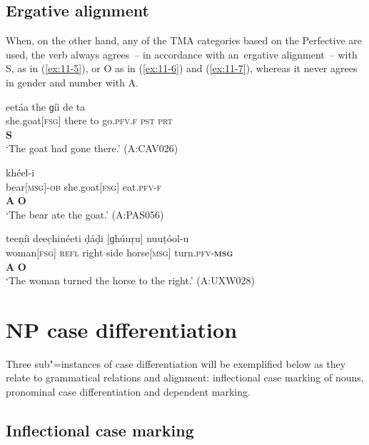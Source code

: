 \subsection{Ergative alignment}
\label{subsec:11-1-2}


When, on the other hand, any of the TMA categories based on the Perfective are used, the verb always agrees~-- in accordance with an~ergative alignment~-- with S, as in (\ref{ex:11-5}), or O as in (\ref{ex:11-6}) and (\ref{ex:11-7}), whereas it never agrees in gender and number with A.

\begin{exe}
\ex
\label{ex:11-5}
\glll [čhéeli] eetáa the ɡíi de ta \\
she.goat[\textsc{fsg}] there to go.\textsc{pfv.}\textsc{f} \textsc{pst} \textsc{prt} \\
 \textbf{S} \\
\glt `The goat had gone there.' (A:CAV026)

\ex
\label{ex:11-6}
\glll [ínc̣-a] [čhéeli] khéel-i \\
bear[\textsc{msg}]-\textsc{ob} she.goat[\textsc{fsg}] eat.\textsc{pfv-}\textsc{f} \\
\textbf{A} \textbf{O} \\
\glt `The bear ate the goat.' (A:PAS056)

\ex
\label{ex:11-7}
\glll [kúṛi] teeṇíi deec̣hinéeti ḍáḍi [ɡhúuṛu] nuuṭóol-u \\
woman[\textsc{fsg}] \textsc{refl} right side horse[\textsc{msg}] turn.\textsc{pfv-}\textbf{\textsc{msg}} \\
\textbf{A} {} {} {}  \textbf{O} \\
\glt `The woman turned the horse to the right.' (A:UXW028)
\end{exe}

\section{NP case differentiation}
\label{sec:11-2}

Three sub"=instances of case differentiation will be exemplified below as they relate to grammatical relations and alignment: inflectional case marking of nouns, pronominal case differentiation and dependent marking.


\subsection{Inflectional case marking}
\label{subsec:11-2-1}


